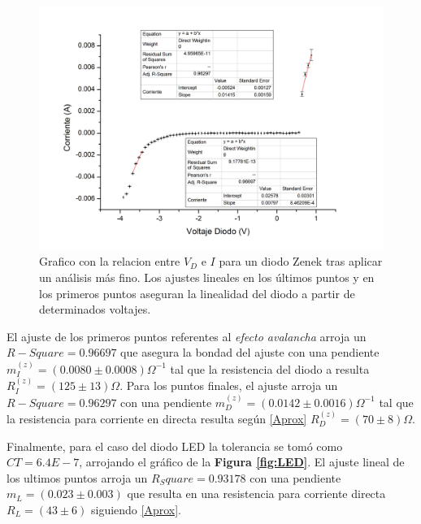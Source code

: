 \documentclass[11pt,a4paper]{article}
\begin{document}
\begin{figure}[H]
\centering
\includegraphics[scale=0.36]{zenek}
   \caption{Grafico con la relacion entre $V_D$ e $I$ para un diodo Zenek tras aplicar un análisis más fino. Los ajustes lineales en los últimos puntos y en los primeros puntos aseguran la linealidad del diodo a partir de determinados voltajes.}
   \label{fig:zenek}
\end{figure}

El ajuste de los primeros puntos referentes al \textit{efecto avalancha} arroja un $R-Square = 0.96697$ que asegura la bondad del ajuste con una pendiente $m_I^{(z)} = (0.0080 \pm 0.0008)\Omega^{-1}$ tal que la resistencia del diodo a resulta $R_I^{(z)} = (125 \pm 13)\Omega$. Para los puntos finales, el ajuste arroja un $R-Square = 0.96297$ con una pendiente $m_D^{(z)} = (0.0142 \pm 0.0016)\Omega^{-1}$ tal que la resistencia para corriente en directa resulta según \eqref{Aprox} $R_D^{(z)} = (70 \pm 8)\Omega$.

Finalmente, para el caso del diodo LED la tolerancia se tomó como $CT = 6.4E-7$, arrojando el gráfico de la \textbf{Figura \ref{fig:LED}}. El ajuste lineal de los ultimos puntos arroja un $R_Square = 0.93178$ con una pendiente $m_L = (0.023 \pm 0.003)$ que resulta en una resistencia para corriente directa $R_L = (43 \pm 6)$ siguiendo \eqref{Aprox}.
\end{document}
